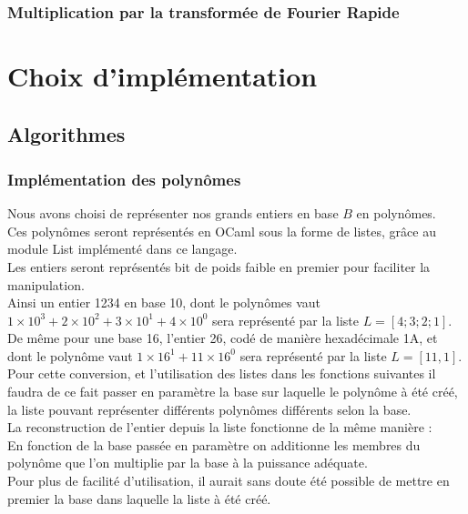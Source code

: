 \documentclass[a4paper]{report}
\begin{document}
      \paragraph{}  
    	\subsection{Multiplication par la transformée de Fourier Rapide} 

      
\chapter{Choix d'implémentation}

  \section{Algorithmes}   
 	\paragraph{}
      	\subsection{Implémentation des polynômes}
      	Nous avons choisi de représenter nos grands entiers en base $B$ en polynômes.
      	\\ Ces polynômes seront représentés en OCaml sous la forme de listes, grâce au module List implémenté dans ce langage.
      	\\ Les entiers seront représentés bit de poids faible en premier pour faciliter la manipulation.
      	\\ Ainsi un entier 1234 en base 10, dont le polynômes vaut $1\times{10^3}+2\times{10^2}+3\times{10^1}+4\times{10^0}$ sera représenté par la liste $L=[4;3;2;1]$.
      	\\ De même pour une base 16, l'entier 26, codé de manière hexadécimale 1A, et dont le polynôme vaut $1\times16^1+11\times16^0$ sera représenté par la liste $L=[11,1]$.
      	\\ Pour cette conversion, et l'utilisation des listes dans les fonctions suivantes il faudra de ce fait passer en paramètre la base sur laquelle le polynôme à été créé, la liste pouvant représenter différents polynômes différents selon la base.
      	\\ La reconstruction de l'entier depuis la liste fonctionne de la même manière :
      	\\ En fonction de la base passée en paramètre on additionne les membres du polynôme que l'on multiplie par la base à la puissance adéquate.
      	\\Pour plus de facilité d'utilisation, il aurait sans doute été possible de mettre en premier la base dans laquelle la liste à été créé.
\end{document}
